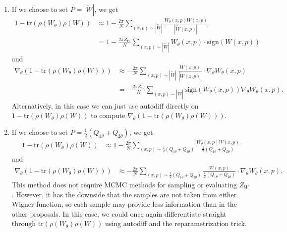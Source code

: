 \documentclass{article}
\begin{document}
\begin{enumerate}
    \item If we choose to set $P = |\widetilde{W}|$, we get \begin{align*}
        1-\text{tr}(\rho(W_\theta)\rho(W)) &\approx 1-\frac{2\pi}{N}\sum_{(x,p)\sim |\widetilde{W}|}\frac{W_\theta(x,p)W(x,p)}{|\widetilde{W}(x,p)|}\\
        &= 1-\frac{2\pi Z_W}{N}\sum_{(x,p)\sim |\widetilde{W}|} W_\theta(x,p)\cdot \text{sign}(W(x,p))
    \end{align*} and \begin{align*}
        \nabla_\theta (1-\text{tr}(\rho(W_\theta)\rho(W))) &\approx -\frac{2\pi}{N}\sum_{(x,p)\sim |\widetilde{W}|}\frac{W(x,p)}{|\widetilde{W}(x,p)|}\cdot \nabla_\theta W_\theta(x,p)\\
        &= -\frac{2\pi Z_W}{N}\sum_{(x,p)\sim |\widetilde{W}|} \text{sign}(W_\theta(x,p))\nabla_\theta W_\theta(x,p).
    \end{align*}  Alternatively, in this case we can just use autodiff directly on $1-\text{tr}(\rho(W_\theta)\rho(W))$ to compute $\nabla_\theta (1-\text{tr}(\rho(W_\theta)\rho(W)))$.

    \item If we choose to set $P = \frac{1}{2}(Q_{1\theta}+Q_{2\theta})$, we get \begin{align*}
        1-\text{tr}(\rho(W_\theta)\rho(W)) &\approx 1-\frac{2\pi}{N}\sum_{(x,p)\sim \frac{1}{2}(Q_{1\theta}+Q_{2\theta})}\frac{W_\theta(x,p)W(x,p)}{\frac{1}{2}(Q_{1\theta}+Q_{2\theta})}
    \end{align*} and \begin{align*}
        \nabla_\theta (1-\text{tr}(\rho(W_\theta)\rho(W))) &\approx -\frac{2\pi}{N}\sum_{(x,p)\sim \frac{1}{2}(Q_{1\theta}+Q_{2\theta})}\frac{W(x,p)}{\frac{1}{2}(Q_{1\theta}+Q_{2\theta})}\cdot \nabla_\theta W_\theta(x,p).
    \end{align*}  This method does not require MCMC methods for sampling or evaluating $Z_W$. However, it has the downside that the samples are not taken from either Wigner function, so each sample may provide less information than in the other proposals. In this case, we could once again differentiate straight through $\text{tr}(\rho(W_\theta)\rho(W))$ using autodiff and the reparametrization trick.
\end{enumerate}
\end{document}
